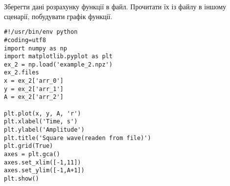 \documentclass[a4paper,12pt]{article}
\begin{document}
 Зберегти дані розрахунку функції в файл. Прочитати їх із файлу в іншому сценарії, побудувати графік функції.
\lstset{language=Python}
\begin{lstlisting}
#!/usr/bin/env python
#coding=utf8
import numpy as np
import matplotlib.pyplot as plt
ex_2 = np.load('example_2.npz')
ex_2.files
x = ex_2['arr_0']
y = ex_2['arr_1']
A = ex_2['arr_2']

plt.plot(x, y, A, 'r')
plt.xlabel('Time, s')
plt.ylabel('Amplitude')
plt.title('Square wave(readen from file)')
plt.grid(True)
axes = plt.gca()
axes.set_xlim([-1,11])
axes.set_ylim([-1,A+1])
plt.show()
\end{lstlisting}
\end{document}
